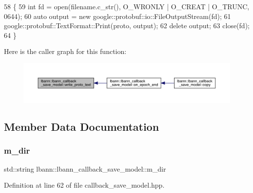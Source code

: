 \begin{DoxyCode}
58                                                                            \{
59   \textcolor{keywordtype}{int} fd = open(filename.c\_str(), O\_WRONLY | O\_CREAT | O\_TRUNC, 0644);
60   \textcolor{keyword}{auto} output = \textcolor{keyword}{new} google::protobuf::io::FileOutputStream(fd);
61   google::protobuf::TextFormat::Print(proto, output);
62   \textcolor{keyword}{delete} output;
63   close(fd);
64 \}
\end{DoxyCode}
Here is the caller graph for this function\+:\nopagebreak
\begin{figure}[H]
\begin{center}
\leavevmode
\includegraphics[width=350pt]{classlbann_1_1lbann__callback__save__model_a9dd2617a12810287c4f5cb87746e71ea_icgraph}
\end{center}
\end{figure}


\subsection{Member Data Documentation}
\mbox{\label{classlbann_1_1lbann__callback__save__model_aca89bd794b4a15b3beb89f3da464fbcd}} 
\subsubsection{\texorpdfstring{m\+\_\+dir}{m\_dir}}
{\footnotesize\ttfamily std\+::string lbann\+::lbann\+\_\+callback\+\_\+save\+\_\+model\+::m\+\_\+dir\hspace{0.3cm}{\ttfamily [private]}}



Definition at line 62 of file callback\+\_\+save\+\_\+model.\+hpp.

\mbox{\label{classlbann_1_1lbann__callback__save__model_a76f51ce7ea7bbb1aff331102c87662bd}} 
